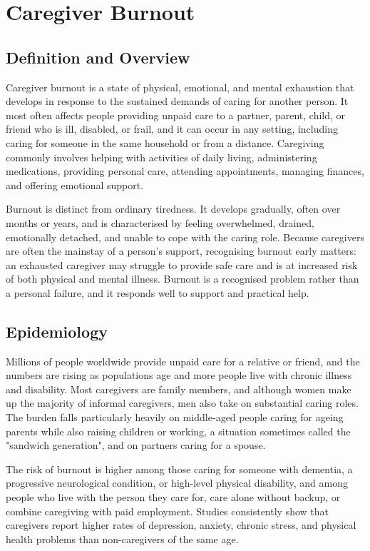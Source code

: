 \chapter{Caregiver Burnout}

\section*{Definition and Overview}
Caregiver burnout is a state of physical, emotional, and mental exhaustion that develops in response to the sustained demands of caring for another person. It most often affects people providing unpaid care to a partner, parent, child, or friend who is ill, disabled, or frail, and it can occur in any setting, including caring for someone in the same household or from a distance. Caregiving commonly involves helping with activities of daily living, administering medications, providing personal care, attending appointments, managing finances, and offering emotional support.

Burnout is distinct from ordinary tiredness. It develops gradually, often over months or years, and is characterised by feeling overwhelmed, drained, emotionally detached, and unable to cope with the caring role. Because caregivers are often the mainstay of a person's support, recognising burnout early matters: an exhausted caregiver may struggle to provide safe care and is at increased risk of both physical and mental illness. Burnout is a recognised problem rather than a personal failure, and it responds well to support and practical help.

\section*{Epidemiology}
Millions of people worldwide provide unpaid care for a relative or friend, and the numbers are rising as populations age and more people live with chronic illness and disability. Most caregivers are family members, and although women make up the majority of informal caregivers, men also take on substantial caring roles. The burden falls particularly heavily on middle-aged people caring for ageing parents while also raising children or working, a situation sometimes called the "sandwich generation", and on partners caring for a spouse.

The risk of burnout is higher among those caring for someone with dementia, a progressive neurological condition, or high-level physical disability, and among people who live with the person they care for, care alone without backup, or combine caregiving with paid employment. Studies consistently show that caregivers report higher rates of depression, anxiety, chronic stress, and physical health problems than non-caregivers of the same age.

